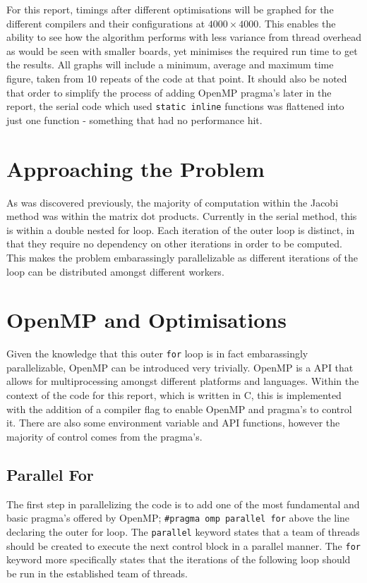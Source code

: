 \documentclass[11pt,twocolumn,a4paper]{article}
\begin{document}
For this report, timings after different optimisations will be graphed for the different compilers and their configurations at $4000\times4000$. This enables the ability to see how the algorithm performs with less variance from thread overhead as would be seen with smaller boards, yet minimises the required run time to get the results. All graphs will include a minimum, average and maximum time figure, taken from 10 repeats of the code at that point. It should also be noted that order to simplify the process of adding OpenMP pragma's later in the report, the serial code which used \texttt{static inline} functions was flattened into just one function - something that had no performance hit. \par


\section{Approaching the Problem}
As was discovered previously, the majority of computation within the Jacobi method was within the matrix dot products. Currently in the serial method, this is within a double nested for loop. Each iteration of the outer loop is distinct, in that they require no dependency on other iterations in order to be computed. This makes the problem embarassingly parallelizable as different iterations of the loop can be distributed amongst different workers. \par


\section{OpenMP and Optimisations}
Given the knowledge that this outer \texttt{for} loop is in fact embarassingly parallelizable, OpenMP can be introduced very trivially. OpenMP is a API that allows for multiprocessing amongst different platforms and languages. Within the context of the code for this report, which is written in C, this is implemented with the addition of a compiler flag to enable OpenMP and pragma's to control it. There are also some environment variable and API functions, however the majority of control comes from the pragma's.

\subsection{Parallel For}
The first step in parallelizing the code is to add one of the most fundamental and basic pragma's offered by OpenMP; \texttt{\#pragma omp parallel for} above the line declaring the outer for loop. The \texttt{parallel} keyword states that a team of threads should be created to execute the next control block in a parallel manner. The \texttt{for} keyword more specifically states that the iterations of the following loop should be run in the established team of threads. \par
\end{document}
